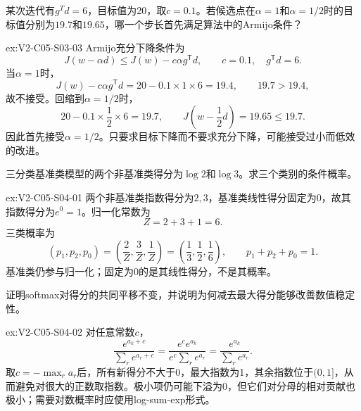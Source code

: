 \begin{SLChapterExercisePairSection}
\begin{exercise}\label{ex:V2-C05-S03-03}
某次迭代有$g^Td=6$，目标值为20，取$c=0.1$。若候选点在$\alpha=1$和$\alpha=1/2$时的目标值分别为$19.7$和$19.65$，哪一个步长首先满足算法中的Armijo条件？
\end{exercise}
\ifSLFullEdition
{}\label{sol:V2-C05-S03-03}
\begin{chapterexercisesolution}{ex:V2-C05-S03-03}
Armijo充分下降条件为
\[
J(w-\alpha d)\leq J(w)-c\alpha g^{\mathsf T}d,
\qquad c=0.1,\quad g^{\mathsf T}d=6.
\]
当$\alpha=1$时，
\[
J(w)-c\alpha g^{\mathsf T}d
=20-0.1\times1\times6
=19.4,
\qquad
19.7>19.4,
\]
故不接受。回缩到$\alpha=1/2$时，
\[
20-0.1\times\frac12\times6=19.7,
\qquad
J\!\left(w-\frac12d\right)=19.65\leq19.7.
\]
因此首先接受$\alpha=1/2$。只要求目标下降而不要求充分下降，可能接受过小而低效的改进。
\end{chapterexercisesolution}
\fi

\begin{exercise}\label{ex:V2-C05-S04-01}
三分类基准类模型的两个非基准类得分为$\log2$和$\log3$。求三个类别的条件概率。
\end{exercise}
\ifSLFullEdition
{}\label{sol:V2-C05-S04-01}
\begin{chapterexercisesolution}{ex:V2-C05-S04-01}
两个非基准类指数得分为$2,3$，基准类线性得分固定为0，故其指数得分为$e^0=1$。归一化常数为
\[
Z=2+3+1=6.
\]
三类概率为
\[
(p_1,p_2,p_0)
=\left(\frac2Z,\frac3Z,\frac1Z\right)
=\left(\frac13,\frac12,\frac16\right),
\qquad
p_1+p_2+p_0=1.
\]
基准类仍参与归一化；固定为0的是其线性得分，不是其概率。
\end{chapterexercisesolution}
\fi

\begin{exercise}\label{ex:V2-C05-S04-02}
证明softmax对得分的共同平移不变，并说明为何减去最大得分能够改善数值稳定性。
\end{exercise}
\ifSLFullEdition
{}\label{sol:V2-C05-S04-02}
\begin{chapterexercisesolution}{ex:V2-C05-S04-02}
对任意常数$c$，
\[
\frac{e^{a_k+c}}{\sum_re^{a_r+c}}
=\frac{e^ce^{a_k}}{e^c\sum_re^{a_r}}
=\frac{e^{a_k}}{\sum_re^{a_r}}.
\]
取$c=-\max_ra_r$后，所有新得分不大于0，最大指数为1，其余指数位于$(0,1]$，从而避免对很大的正数取指数。极小项仍可能下溢为0，但它们对分母的相对贡献也极小；需要对数概率时应使用log-sum-exp形式。
\end{chapterexercisesolution}
\fi


\end{SLChapterExercisePairSection}
